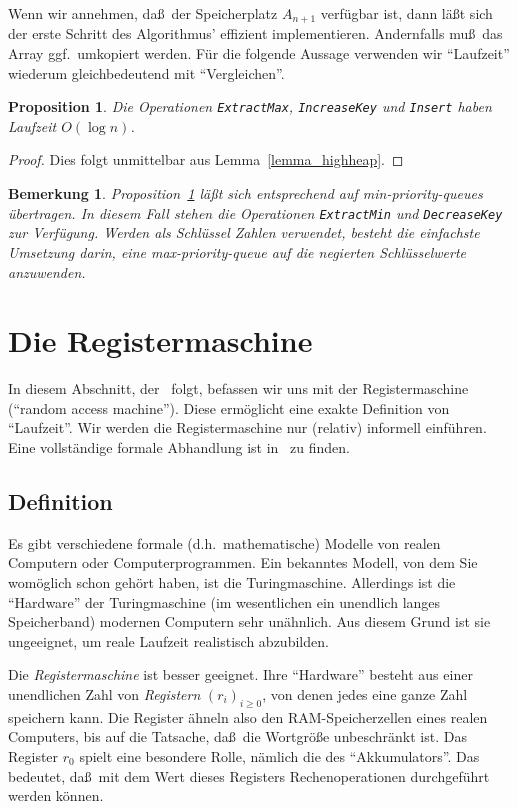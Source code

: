 \documentclass[10pt,reqno]{amsart}
\numberwithin{equation}{section}
\newtheorem{remark}[definition]{Bemerkung}
\newtheorem{proposition}[definition]{Proposition}
\newcommand\Lem{Lemma}
\newcommand\Prop{Proposition}
\begin{document}
Wenn wir annehmen, da\ss\ der Speicherplatz $A_{n+1}$ verf\"ugbar ist, dann l\"a\ss t sich der erste Schritt des Algorithmus' effizient implementieren.
Andernfalls mu\ss\ das Array ggf.\ umkopiert werden.
F\"ur die folgende Aussage verwenden wir ``Laufzeit'' wiederum gleichbedeutend mit ``Vergleichen''.

\begin{proposition}\label{prop_priority}
	Die Operationen {\tt ExtractMax}, {\tt IncreaseKey} und {\tt Insert} haben Laufzeit $O(\log n)$.
\end{proposition}
\begin{proof}
	Dies folgt unmittelbar aus \Lem~\ref{lemma_highheap}.
\end{proof}

\begin{remark}\label{rem_min}\upshape
	\Prop~\ref{prop_priority} l\"a\ss t sich entsprechend auf min-priority-queues \"ubertragen.
	In diesem Fall stehen die Operationen {\tt ExtractMin} und {\tt DecreaseKey} zur Verf\"ugung.
	Werden als Schl\"ussel Zahlen verwendet, besteht die einfachste Umsetzung darin, eine max-priority-queue auf die {\em negierten} Schl\"usselwerte anzuwenden.
\end{remark}

\section{Die Registermaschine}\label{sec_ram}
In diesem Abschnitt, der~\cite{Papadimitriou} folgt, befassen wir uns mit der Registermaschine (``random access machine'').
Diese erm\"oglicht eine exakte Definition von ``Laufzeit''.
Wir werden die Registermaschine nur (relativ) informell einf\"uhren.
Eine vollst\"andige formale Abhandlung ist in~\cite{Papadimitriou} zu finden.

\subsection{Definition}\label{sec_ram_def}
Es gibt verschiedene formale (d.h.\ mathematische) Modelle von realen Computern oder Computerprogrammen.
Ein bekanntes Modell, von dem Sie wom\"oglich schon geh\"ort haben, ist die Turingmaschine.
Allerdings ist die ``Hardware'' der Turingmaschine (im wesentlichen ein unendlich langes Speicherband) modernen Computern sehr un\"ahnlich.
Aus diesem Grund ist sie ungeeignet, um reale Laufzeit realistisch abzubilden.

Die {\em Registermaschine} ist besser geeignet.
Ihre ``Hardware'' besteht aus einer unendlichen Zahl von {\em Registern} $(r_i)_{i\geq0}$, von denen jedes eine ganze Zahl speichern kann.
Die Register \"ahneln also den RAM-Speicherzellen eines realen Computers, bis auf die Tatsache, da\ss\ die Wortgr\"o\ss e unbeschr\"ankt ist.
Das Register $r_0$ spielt eine besondere Rolle, n\"amlich die des ``Akkumulators''.
Das bedeutet, da\ss\ mit dem Wert dieses Registers Rechenoperationen durchgef\"uhrt werden k\"onnen.
\end{document}
